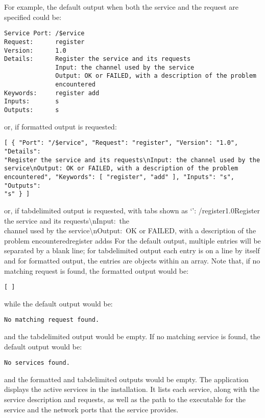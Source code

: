 For example, the default output when both the service and the request are specified could
be:
\outputBegin
\begin{verbatim}
Service Port: /$ervice
Request:      register
Version:      1.0
Details:      Register the service and its requests
              Input: the channel used by the service
              Output: OK or FAILED, with a description of the problem
              encountered
Keywords:     register add
Inputs:       s
Outputs:      s
\end{verbatim}
\outputEnd{}
or, if \json\longDash{}formatted output is requested:
\outputBegin
\begin{verbatim}
[ { "Port": "/$ervice", "Request": "register", "Version": "1.0", "Details":
"Register the service and its requests\nInput: the channel used by the
service\nOutput: OK or FAILED, with a description of the problem
encountered", "Keywords": [ "register", "add" ], "Inputs": "s", "Outputs":
"s" } ]
\end{verbatim}
\outputEnd
or, if tab\longDash{}delimited output is requested, with tabs shown as `\tabSymbol':
\outputBegin{}
/\dollarService\pseudotab{}register\pseudotab{}1.0\pseudotab{}Register the service and its
requests\textbackslash{}nInput:\ the\\
channel used by the service\textbackslash{}nOutput:\ OK or FAILED, with a description of
the\\
problem encountered\pseudotab{}register add\pseudotab{}s\pseudotab{}s
\outputEnd{}
For the default output, multiple entries will be separated by a blank line; for
tab\longDash{}delimited output each entry is on a line by itself and for
\json\longDash{}formatted output, the entries are objects within an array.
Note that, if no matching request is found, the \json\longDash{}formatted output would be:
\outputBegin
\begin{verbatim}
[ ]
\end{verbatim}
\outputEnd{}
while the default output would be:
\outputBegin
\begin{verbatim}
No matching request found.
\end{verbatim}
\outputEnd{}
and the tab\longDash{}delimited output would be empty.
If no matching service is found, the default output would be:
\outputBegin
\begin{verbatim}
No services found.
\end{verbatim}
\outputEnd{}
and the \json\longDash{}formatted and tab\longDash{}delimited outputs would be empty.
\condPage
{}
The application  displays the active services in the
\mplusm{} installation.
It lists each service, along with the service description and requests, as well as the
path to the executable for the service and the \yarp{} network ports that the service
provides.\\

